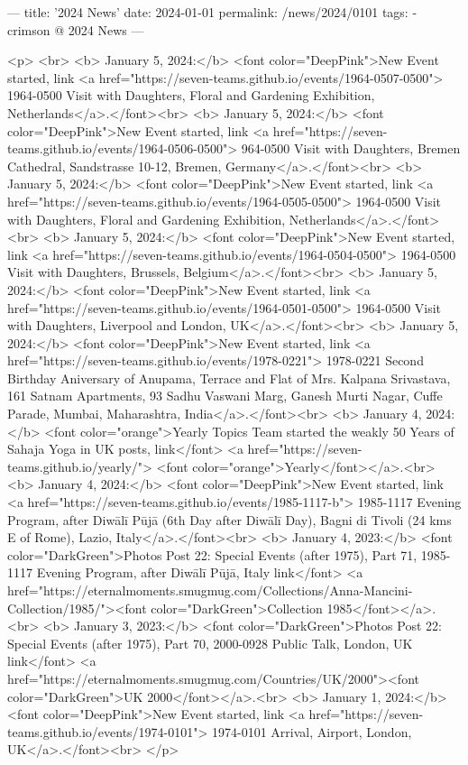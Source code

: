---
title: '2024 News'
date: 2024-01-01
permalink: /news/2024/0101
tags:
  - crimson @ 2024 News
---

<p>
<br>
<b> January 5, 2024:</b> <font color="DeepPink">New Event started, link <a href="https://seven-teams.github.io/events/1964-0507-0500"> 1964-0500 Visit with Daughters, Floral and Gardening Exhibition, Netherlands</a>.</font><br>
<b> January 5, 2024:</b> <font color="DeepPink">New Event started, link <a href="https://seven-teams.github.io/events/1964-0506-0500"> 964-0500 Visit with Daughters, Bremen Cathedral, Sandstrasse 10-12, Bremen, Germany</a>.</font><br>
<b> January 5, 2024:</b> <font color="DeepPink">New Event started, link <a href="https://seven-teams.github.io/events/1964-0505-0500"> 1964-0500 Visit with Daughters, Floral and Gardening Exhibition, Netherlands</a>.</font><br>
<b> January 5, 2024:</b> <font color="DeepPink">New Event started, link <a href="https://seven-teams.github.io/events/1964-0504-0500"> 1964-0500 Visit with Daughters, Brussels, Belgium</a>.</font><br>
<b> January 5, 2024:</b> <font color="DeepPink">New Event started, link <a href="https://seven-teams.github.io/events/1964-0501-0500"> 1964-0500 Visit with Daughters, Liverpool and London, UK</a>.</font><br>
<b> January 5, 2024:</b> <font color="DeepPink">New Event started, link <a href="https://seven-teams.github.io/events/1978-0221"> 1978-0221 Second Birthday Aniversary of Anupama, Terrace and Flat of Mrs. Kalpana Srivastava, 161 Satnam Apartments, 93 Sadhu Vaswani Marg, Ganesh Murti Nagar, Cuffe Parade, Mumbai, Maharashtra, India</a>.</font><br>
<b> January 4, 2024:</b> <font color="orange">Yearly Topics Team started the weakly 50 Years of Sahaja Yoga in UK posts, link</font> <a href="https://seven-teams.github.io/yearly/"> <font color="orange">Yearly</font></a>.<br>
<b> January 4, 2024:</b> <font color="DeepPink">New Event started, link <a href="https://seven-teams.github.io/events/1985-1117-b"> 1985-1117 Evening Program, after Diwālī Pūjā (6th Day after Diwālī Day), Bagni di Tivoli (24 kms E of Rome), Lazio, Italy</a>.</font><br>
<b> January 4, 2023:</b> <font color="DarkGreen">Photos Post 22: Special Events (after 1975), Part 71, 1985-1117 Evening Program, after Diwālī Pūjā, Italy link</font> <a href="https://eternalmoments.smugmug.com/Collections/Anna-Mancini-Collection/1985/"><font color="DarkGreen">Collection 1985</font></a>.<br>
<b> January 3, 2023:</b> <font color="DarkGreen">Photos Post 22: Special Events (after 1975), Part 70, 2000-0928 Public Talk, London, UK link</font> <a href="https://eternalmoments.smugmug.com/Countries/UK/2000"><font color="DarkGreen">UK 2000</font></a>.<br>
<b> January 1, 2024:</b> <font color="DeepPink">New Event started, link <a href="https://seven-teams.github.io/events/1974-0101"> 1974-0101 Arrival, Airport, London, UK</a>.</font><br>
</p>